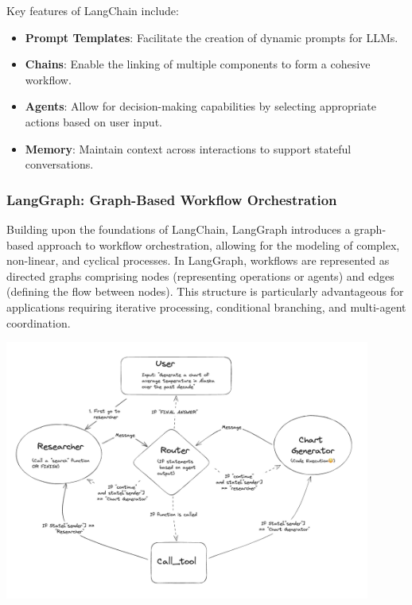 Key features of LangChain include:
\begin{itemize}
    \item \textbf{Prompt Templates}: Facilitate the creation of dynamic prompts for LLMs.
    \item \textbf{Chains}: Enable the linking of multiple components to form a cohesive workflow.
    \item \textbf{Agents}: Allow for decision-making capabilities by selecting appropriate actions based on user input.
    \item \textbf{Memory}: Maintain context across interactions to support stateful conversations.
\end{itemize}

\subsubsection{LangGraph: Graph-Based Workflow Orchestration}
Building upon the foundations of LangChain, LangGraph introduces a graph-based approach to workflow orchestration, allowing for the modeling of complex, non-linear, and cyclical processes. In LangGraph, workflows are represented as directed graphs comprising nodes (representing operations or agents) and edges (defining the flow between nodes). This structure is particularly advantageous for applications requiring iterative processing, conditional branching, and multi-agent coordination.

\begin{center}
    \centering
    \includegraphics[width=0.9\textwidth]{Images/langgraph_mutil_agent.png}
     \cite{langgraphMultiAgent}
    \label{fig:langgraph_multi_agent}
\end{center}

